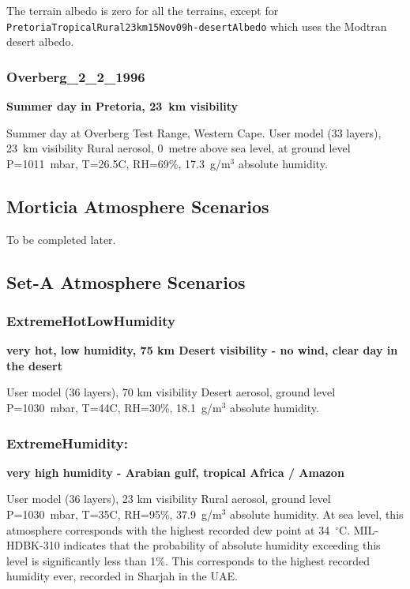 \documentclass{workpackage}
\begin{document}
The terrain albedo is zero for all the terrains, except for 
\lstinline{PretoriaTropicalRural23km15Nov09h-desertAlbedo} which uses the Modtran desert albedo.


\subsubsection{Overberg\_2\_2\_1996}
\label{sec:Overberg221996}

\textbf{Summer day in Pretoria, 23~\si{\kilo\metre} visibility}

Summer day at Overberg Test Range, Western Cape.
User model (33 layers), 23~\si{\kilo\metre} visibility Rural aerosol,  0~\si{metre} above sea level,   at ground level P=1011~mbar, T=26.5C, RH=69\%, 17.3~g/m$^3$  absolute humidity.



\subsection{Morticia Atmosphere Scenarios}
\label{sec:MorticiaAtmosphereScenarios}

To be completed later.

\subsection{Set-A Atmosphere Scenarios}
\label{sec:SetAAtmosphereScenarios}


\subsubsection{ExtremeHotLowHumidity}
\label{sec:ExtremeHotLowHumidity}

\textbf{very hot, low humidity, 75 km Desert visibility - no wind, clear day in the desert}

User model (36 layers), 70 km visibility  Desert aerosol, ground level P=1030~mbar, T=44C, RH=30\%, 18.1~g/m$^3$  absolute humidity.

\subsubsection{ExtremeHumidity:}
\label{sec:ExtremeHumidity}

\textbf{very high humidity - Arabian gulf, tropical Africa / Amazon}

User model (36 layers), 23 km visibility  Rural aerosol, ground level P=1030~mbar, T=35C, RH=95\%, 37.9~g/m$^3$ absolute humidity. 
At sea level, this atmosphere corresponds with  the highest recorded dew point at 34~$^\circ$C.  MIL-HDBK-310 indicates that the probability of absolute humidity exceeding this level is significantly less than 1\%. This corresponds to the highest recorded humidity ever, recorded in Sharjah in the UAE.
\end{document}
